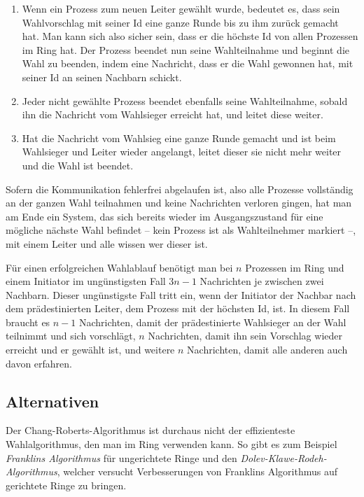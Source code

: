 \begin{enumerate}
\begin{enumerate}
\begin{enumerate}
                    \end{enumerate}
          \end{enumerate}
    \item Wenn ein Prozess zum neuen Leiter gewählt wurde, bedeutet es, dass sein Wahlvorschlag mit seiner Id eine ganze Runde bis zu ihm zurück 
          gemacht hat. Man kann sich also sicher sein, dass er die höchste Id von allen Prozessen im Ring hat. Der Prozess beendet nun seine Wahlteilnahme
          und beginnt die Wahl zu beenden, indem eine Nachricht, dass er die Wahl gewonnen hat, mit seiner Id an seinen Nachbarn schickt.
    \item Jeder nicht gewählte Prozess beendet ebenfalls seine Wahlteilnahme, sobald ihn die Nachricht vom Wahlsieger erreicht hat, und leitet diese weiter.
    \item Hat die Nachricht vom Wahlsieg eine ganze Runde gemacht und ist beim Wahlsieger und Leiter wieder angelangt, leitet dieser sie nicht mehr weiter
          und die Wahl ist beendet.
\end{enumerate}

Sofern die Kommunikation fehlerfrei abgelaufen ist, also alle Prozesse vollständig an der ganzen Wahl teilnahmen und keine Nachrichten verloren gingen,
hat man am Ende ein System, das sich bereits wieder im Ausgangszustand für eine mögliche nächste Wahl befindet -- kein Prozess ist als Wahlteilnehmer 
markiert --, mit einem Leiter und alle wissen wer dieser ist.

Für einen erfolgreichen Wahlablauf benötigt man bei $n$ Prozessen im Ring und einem Initiator im ungünstigsten Fall $3n-1$ Nachrichten je zwischen zwei 
Nachbarn. Dieser ungünstigste Fall tritt ein, wenn der Initiator der Nachbar nach dem prädestinierten Leiter, dem Prozess mit der höchsten Id, ist.
In diesem Fall braucht es $n-1$ Nachrichten, damit der prädestinierte Wahlsieger an der Wahl teilnimmt und sich vorschlägt, $n$ Nachrichten, damit ihn
sein Vorschlag wieder erreicht und er gewählt ist, und weitere $n$ Nachrichten, damit alle anderen auch davon erfahren.

\subsection{Alternativen}

Der Chang-Roberts-Algorithmus ist durchaus nicht der effizienteste Wahlalgorithmus, den man im Ring verwenden kann. So gibt es zum Beispiel
\textit{Franklins Algorithmus}\cite{franklin82} für ungerichtete Ringe und den \textit{Dolev-Klawe-Rodeh-Algorithmus}, welcher versucht Verbesserungen von 
Franklins Algorithmus auf gerichtete Ringe zu bringen\cite{bonakdarpur}.
